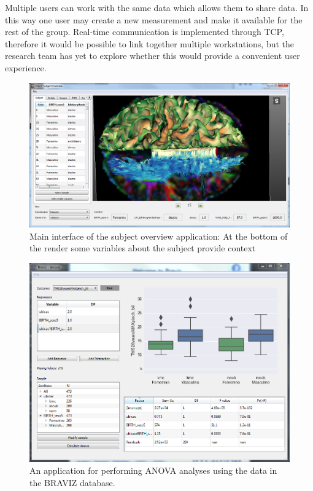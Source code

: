 \documentclass[twocolumn]{svjour3}
\begin{document}
Multiple users can work with the same data  which allows them to share data. In this way one user may create a new measurement and make it available for the rest of the group. Real-time communication is implemented through TCP, therefore it would be possible to link together multiple workstations, but the research team has yet to explore whether this would provide a convenient user experience.

\begin{figure}
\begin{center}
\includegraphics[width=\linewidth]{subj_overview_full}
\end{center}
 \caption{\label{fig_subject}Main interface of the subject overview application: At the bottom of the render some variables about the subject provide context}
\end{figure}

\begin{figure}
\begin{center}
\includegraphics[width=\linewidth]{anova.png}
\end{center}
 \caption{\label{fig_anova}An application for performing ANOVA analyses using the data in the BRAVIZ database.}
\end{figure}
\end{document}
